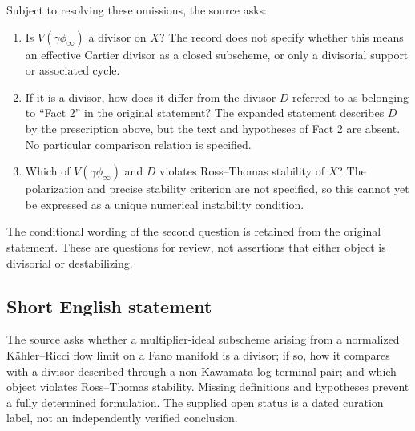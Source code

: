 \documentclass[11pt]{article}
\begin{document}
Subject to resolving these omissions, the source asks:
\begin{enumerate}
\item Is \(V(\gamma\phi_\infty)\) a divisor on \(X\)? The record does not specify whether this means an effective Cartier divisor as a closed subscheme, or only a divisorial support or associated cycle.
\item If it is a divisor, how does it differ from the divisor \(D\) referred to as belonging to ``Fact 2'' in the original statement? The expanded statement describes \(D\) by the prescription above, but the text and hypotheses of Fact 2 are absent. No particular comparison relation is specified.
\item Which of \(V(\gamma\phi_\infty)\) and \(D\) violates Ross--Thomas stability of \(X\)? The polarization and precise stability criterion are not specified, so this cannot yet be expressed as a unique numerical instability condition.
\end{enumerate}
The conditional wording of the second question is retained from the original statement. These are questions for review, not assertions that either object is divisorial or destabilizing.
\subsection{Short English statement}
The source asks whether a multiplier-ideal subscheme arising from a normalized Kähler--Ricci flow limit on a Fano manifold is a divisor; if so, how it compares with a divisor described through a non-Kawamata-log-terminal pair; and which object violates Ross--Thomas stability. Missing definitions and hypotheses prevent a fully determined formulation. The supplied open status is a dated curation label, not an independently verified conclusion.
\end{document}
